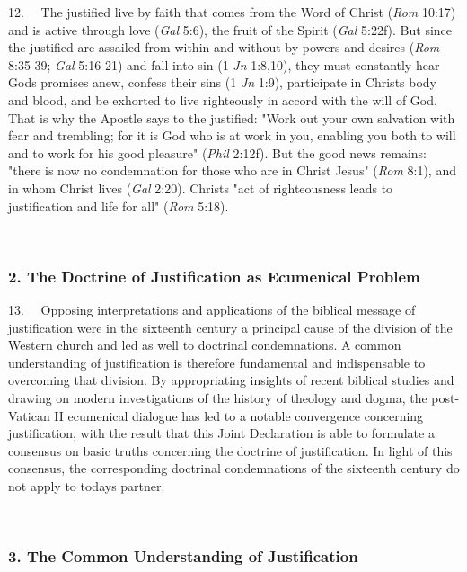12.~ ~The justified live by faith that comes from the Word of Christ
(\emph{Rom} 10:17) and is active through love (\emph{Gal} 5:6), the
fruit of the Spirit (\emph{Gal} 5:22f). But since the justified are
assailed from within and without by powers and desires (\emph{Rom}
8:35-39; \emph{Gal} 5:16-21) and fall into sin (1 \emph{Jn} 1:8,10),
they must constantly hear God\textquotesingle s promises anew, confess
their sins (1 \emph{Jn} 1:9), participate in Christ\textquotesingle s
body and blood, and be exhorted to live righteously in accord with the
will of God. That is why the Apostle says to the justified: "Work out
your own salvation with fear and trembling; for it is God who is at work
in you, enabling you both to will and to work for his good pleasure"
(\emph{Phil} 2:12f). But the good news remains: "there is now no
condemnation for those who are in Christ Jesus" (\emph{Rom} 8:1), and in
whom Christ lives (\emph{Gal} 2:20). Christ\textquotesingle s "act of
righteousness leads to justification and life for all" (\emph{Rom}
5:18).

~

\subsubsection{2. The Doctrine of Justification as Ecumenical
Problem}\label{the-doctrine-of-justification-as-ecumenical-problem}

13.~ ~Opposing interpretations and applications of the biblical message
of justification were in the sixteenth century a principal cause of the
division of the Western church and led as well to doctrinal
condemnations. A common understanding of justification is therefore
fundamental and indispensable to overcoming that division. By
appropriating insights of recent biblical studies and drawing on modern
investigations of the history of theology and dogma, the post-Vatican II
ecumenical dialogue has led to a notable convergence concerning
justification, with the result that this Joint Declaration is able to
formulate a consensus on basic truths concerning the doctrine of
justification. In light of this consensus, the corresponding doctrinal
condemnations of the sixteenth century do not apply to
today\textquotesingle s partner.

~

\subsubsection{3. The Common Understanding of
Justification}\label{the-common-understanding-of-justification}

